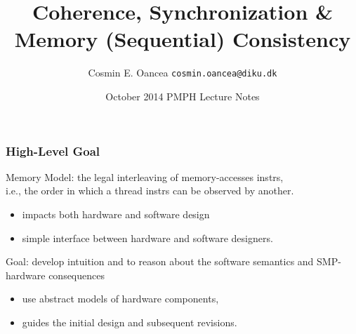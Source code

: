 \documentclass{beamer}
\title[Interconnect]{Coherence, Synchronization \&\\Memory (Sequential) Consistency}
\author[C.~Oancea]{Cosmin E. Oancea {\tt cosmin.oancea@diku.dk}}
\institute{Department of Computer Science (DIKU)\\University of Copenhagen}
\date[Sept 2014]{October 2014 PMPH Lecture Notes}
\newcommand{\emp}[1]{\textcolor{DikuRed}{ #1}}
\begin{document}
\titleslide




\begin{frame}[fragile]
	\tableofcontents
\end{frame}



\begin{frame}[fragile,t]
\frametitle{High-Level Goal}

\emp{Memory Model}: the legal interleaving of memory-accesses instrs,\\
    i.e., the order in which a thread instrs can be observed by another. 
\begin{itemize}
    \item impacts both hardware and software design
    \item simple interface between hardware and software designers.
\end  {itemize}\bigskip

\emp{Goal: develop intuition and to reason} about the software 
        semantics and SMP-hardware consequences
\begin{itemize}
    \item use abstract models of hardware components,
    \item guides the initial design and subsequent revisions.    
\end  {itemize}\bigskip

\end{frame}
\end{document}
